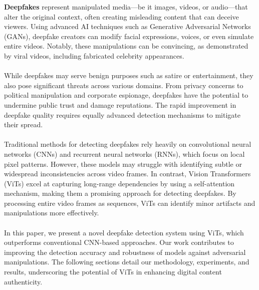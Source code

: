 \textbf{Deepfakes} represent manipulated media—be it images, videos, or audio—that alter the original context, often creating misleading content that can deceive viewers. Using advanced AI techniques such as Generative Adversarial Networks (GANs), deepfake creators can modify facial expressions, voices, or even simulate entire videos. Notably, these manipulations can be convincing, as demonstrated by viral videos, including fabricated celebrity appearances.\\\\
 While deepfakes may serve benign purposes such as satire or entertainment, they also pose significant threats across various domains. From privacy concerns to political manipulation and corporate espionage, deepfakes have the potential to undermine public trust and damage reputations. The rapid improvement in deepfake quality requires equally advanced detection mechanisms to mitigate their spread.\\\\
Traditional methods for detecting deepfakes rely heavily on convolutional neural networks (CNNs) and recurrent neural networks (RNNs), which focus on local pixel patterns. However, these models may struggle with identifying subtle or widespread inconsistencies across video frames. In contrast, Vision Transformers (ViTs) excel at capturing long-range dependencies by using a self-attention mechanism, making them a promising approach for detecting deepfakes. By processing entire video frames as sequences, ViTs can identify minor artifacts and manipulations more effectively.\\\\
In this paper, we present a novel deepfake detection system using ViTs, which outperforms conventional CNN-based approaches. Our work contributes to improving the detection accuracy and robustness of models against adversarial manipulations. The following sections detail our methodology, experiments, and results, underscoring the potential of ViTs in enhancing digital content authenticity.\\